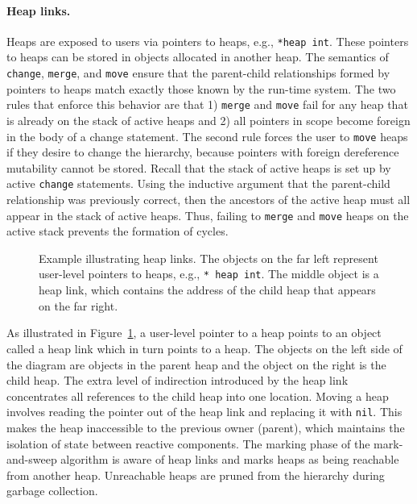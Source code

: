 \paragraph{Heap links.}
Heaps are exposed to users via pointers to heaps, e.g., \verb+*heap int+.
These pointers to heaps can be stored in objects allocated in another heap.
The semantics of \verb+change+, \verb+merge+, and \verb+move+ ensure that the parent-child relationships formed by pointers to heaps match exactly those known by the run-time system.
The two rules that enforce this behavior are that 1) \verb+merge+ and \verb+move+ fail for any heap that is already on the stack of active heaps and 2) all pointers in scope become foreign in the body of a change statement.
The second rule forces the user to \verb+move+ heaps if they desire to change the hierarchy, because pointers with foreign dereference mutability cannot be stored.
Recall that the stack of active heaps is set up by active \verb+change+ statements.
Using the inductive argument that the parent-child relationship was previously correct, then the ancestors of the active heap must all appear in the stack of active heaps.
Thus, failing to \verb+merge+ and \verb+move+ heaps on the active stack prevents the formation of cycles.

\begin{figure}
\centering
\begingroup
\fontsize{10pt}{12pt}\selectfont
{}
\endgroup
\cprotect\caption{Example illustrating heap links.  The objects on the far left represent user-level pointers to heaps, e.g., \verb+* heap int+.  The middle object is a heap link, which contains the address of the child heap that appears on the far right.}
\label{heap_link}
\end{figure}

As illustrated in Figure~\ref{heap_link}, a user-level pointer to a heap points to an object called a heap link which in turn points to a heap.
The objects on the left side of the diagram are objects in the parent heap and the object on the right is the child heap.
The extra level of indirection introduced by the heap link concentrates all references to the child heap into one location.
Moving a heap involves reading the pointer out of the heap link and replacing it with \verb+nil+.
This makes the heap inaccessible to the previous owner (parent), which maintains the isolation of state between reactive components.
The marking phase of the mark-and-sweep algorithm is aware of heap links and marks heaps as being reachable from another heap.
Unreachable heaps are pruned from the hierarchy during garbage collection.


